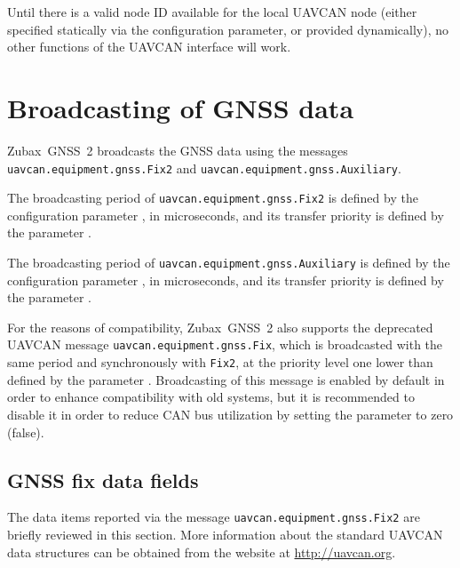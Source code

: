 \documentclass{zubaxdoc}
\begin{document}
Until there is a valid node ID available for the local UAVCAN node (either specified
statically via the configuration parameter, or provided dynamically),
no other functions of the UAVCAN interface will work.

\section{Broadcasting  of GNSS data}

Zubax~GNSS~2 broadcasts the GNSS data using the messages
\verb|uavcan.equipment.gnss.Fix2| and \verb|uavcan.equipment.gnss.Auxiliary|.

The broadcasting period of \verb|uavcan.equipment.gnss.Fix2| is defined by the configuration
parameter , in microseconds, and its transfer priority is defined by the
parameter .

The broadcasting period of \verb|uavcan.equipment.gnss.Auxiliary| is defined by the configuration
parameter , in microseconds, and its transfer priority is defined by the
parameter .

For the reasons of compatibility, Zubax~GNSS~2 also supports the deprecated UAVCAN message
\verb|uavcan.equipment.gnss.Fix|, which is broadcasted with the same period and
synchronously with \verb|Fix2|, at the priority level one lower than
defined by the parameter .
Broadcasting of this message is enabled by default in order to enhance compatibility with old systems,
but it is recommended to disable it in order to reduce CAN bus utilization by setting
the parameter  to zero (false).

\subsection{GNSS fix data fields}

The data items reported via the message \verb|uavcan.equipment.gnss.Fix2| are briefly reviewed in this section.
More information about the standard UAVCAN data structures can be obtained from the website at
\url{http://uavcan.org}.
\end{document}
